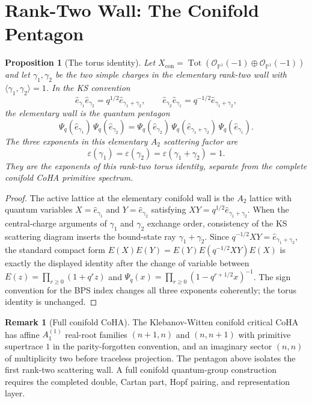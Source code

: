 \documentclass[11pt]{article}
\newtheorem{proposition}[theorem]{Proposition}
\theoremstyle{definition}
\newtheorem{remark}[theorem]{Remark}
\begin{document}
\section{Rank-Two Wall: The Conifold Pentagon}

\begin{proposition}[The torus identity]
\label{prop:conifold-pentagon}
Let
$X_{\mathrm{con}}=\operatorname{Tot}(\mathcal O_{\mathbb P^1}(-1)
\oplus\mathcal O_{\mathbb P^1}(-1))$ and let
$\gamma_1,\gamma_2$ be the two simple charges in the elementary
rank-two wall with
$\langle\gamma_1,\gamma_2\rangle=1$. In the KS convention
\[
 \hat e_{\gamma_1}\hat e_{\gamma_2}
 =
 q^{1/2}\hat e_{\gamma_1+\gamma_2},
 \qquad
 \hat e_{\gamma_2}\hat e_{\gamma_1}
 =
 q^{-1/2}\hat e_{\gamma_1+\gamma_2},
\]
the elementary wall is the quantum pentagon
\[
 \Psi_q(\hat e_{\gamma_1})\,
 \Psi_q(\hat e_{\gamma_2})
 =
 \Psi_q(\hat e_{\gamma_2})\,
 \Psi_q(\hat e_{\gamma_1+\gamma_2})\,
 \Psi_q(\hat e_{\gamma_1}).
\]
The three exponents in this elementary $A_2$ scattering factor are
\[
 \varepsilon(\gamma_1)=
 \varepsilon(\gamma_2)=
 \varepsilon(\gamma_1+\gamma_2)=1.
\]
They are the exponents of this rank-two torus identity, separate from
the complete conifold CoHA primitive spectrum.
\end{proposition}

\begin{proof}
The active lattice at the elementary conifold wall is the $A_2$ lattice
with quantum variables $X=\hat e_{\gamma_1}$ and
$Y=\hat e_{\gamma_2}$ satisfying $XY=q^{1/2}\hat e_{\gamma_1+\gamma_2}$.
When the central-charge arguments of $\gamma_1$ and $\gamma_2$ exchange
order, consistency of the KS scattering diagram inserts the bound-state
ray $\gamma_1+\gamma_2$. Since
$q^{-1/2}XY=\hat e_{\gamma_1+\gamma_2}$, the standard compact form
$E(X)E(Y)=E(Y)E(q^{-1/2}XY)E(X)$ is exactly the displayed identity after
the change of variable between $E(z)=\prod_{r\ge0}(1+q^r z)$ and
$\Psi_q(x)=\prod_{r\ge0}(1-q^{r+1/2}x)^{-1}$. The sign convention for
the BPS index changes all three exponents coherently; the torus identity
is unchanged.
\end{proof}

\begin{remark}[Full conifold CoHA]
The Klebanov-Witten conifold critical CoHA has affine
$A_1^{(1)}$ real-root families $(n+1,n)$ and $(n,n+1)$ with primitive
supertrace $1$ in the parity-forgotten convention, and an imaginary
sector $(n,n)$ of multiplicity two before traceless projection. The
pentagon above isolates the first rank-two scattering wall. A full
conifold quantum-group construction requires the completed double,
Cartan part, Hopf pairing, and representation layer.
\end{remark}
\end{document}
